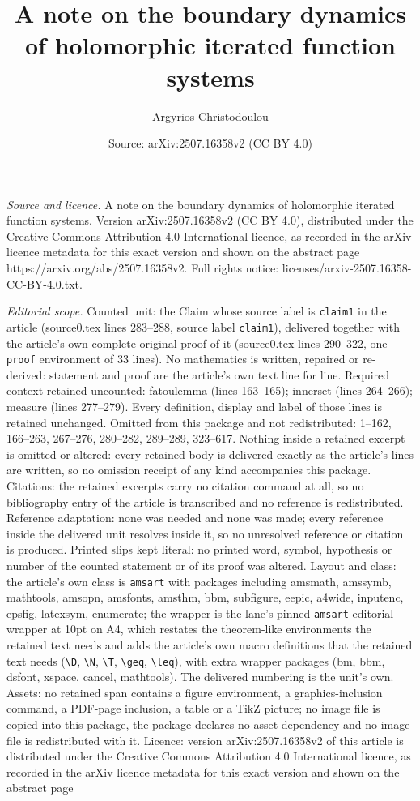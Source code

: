 \documentclass[10pt,a4paper]{amsart}
\title[A note on the boundary dynamics of holomorphic iterated func]{A note on the boundary dynamics of holomorphic iterated function systems}
\author{Argyrios Christodoulou}
\date{Source: arXiv:2507.16358v2 (CC BY 4.0)}
\begin{document}
\maketitle

\noindent\emph{Source and licence.} A note on the boundary dynamics of holomorphic iterated function systems. Version arXiv:2507.16358v2 (CC BY 4.0), distributed under the Creative Commons Attribution 4.0 International licence, as recorded in the arXiv licence metadata for this exact version and shown on the abstract page https://arxiv.org/abs/2507.16358v2. Full rights notice: licenses/arxiv-2507.16358-CC-BY-4.0.txt.\par\smallskip

\noindent\textit{Editorial scope.} Counted unit: the Claim whose source label is \texttt{claim1} in the article (source0.tex lines 283--288, source label \texttt{claim1}), delivered together with the article's own complete original proof of it (source0.tex lines 290--322, one \texttt{proof} environment of 33 lines). No mathematics is written, repaired or re-derived: statement and proof are the article's own text line for line. Required context retained uncounted: fatoulemma (lines 163--165); innerset (lines 264--266); measure (lines 277--279). Every definition, display and label of those lines is retained unchanged. Omitted from this package and not redistributed: 1--162, 166--263, 267--276, 280--282, 289--289, 323--617. Nothing inside a retained excerpt is omitted or altered: every retained body is delivered exactly as the article's lines are written, so no omission receipt of any kind accompanies this package. Citations: the retained excerpts carry no citation command at all, so no bibliography entry of the article is transcribed and no reference is redistributed. Reference adaptation: none was needed and none was made; every reference inside the delivered unit resolves inside it, so no unresolved reference or citation is produced. Printed slips kept literal: no printed word, symbol, hypothesis or number of the counted statement or of its proof was altered. Layout and class: the article's own class is \texttt{amsart} with packages including amsmath, amssymb, mathtools, amsopn, amsfonts, amsthm, bbm, subfigure, eepic, a4wide, inputenc, epsfig, latexsym, enumerate; the wrapper is the lane's pinned \texttt{amsart} editorial wrapper at 10pt on A4, which restates the theorem-like environments the retained text needs and adds the article's own macro definitions that the retained text needs (\texttt{\textbackslash D}, \texttt{\textbackslash N}, \texttt{\textbackslash T}, \texttt{\textbackslash geq}, \texttt{\textbackslash leq}), with extra wrapper packages (bm, bbm, dsfont, xspace, cancel, mathtools). The delivered numbering is the unit's own. Assets: no retained span contains a figure environment, a graphics-inclusion command, a PDF-page inclusion, a table or a TikZ picture; no image file is copied into this package, the package declares no asset dependency and no image file is redistributed with it. Licence: version arXiv:2507.16358v2 of this article is distributed under the Creative Commons Attribution 4.0 International licence, as recorded in the arXiv licence metadata for this exact version and shown on the abstract page 
\end{document}
